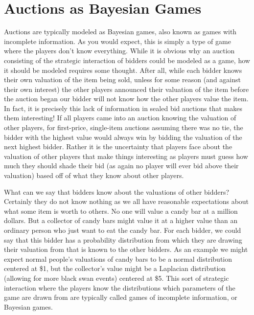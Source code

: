 \documentclass[12pt,twoside]{reedthesis}
\begin{document}
\section{Auctions as Bayesian Games}
Auctions are typically modeled as Bayesian games, also known as games with incomplete information. As you would expect, this is simply a type of game where the players don't know everything. While it is obvious why an auction consisting of the strategic interaction of bidders could be modeled as a game, how it should be modeled requires some thought. After all, while each bidder knows their own valuation of the item being sold, unless for some reason (and against their own interest) the other players announced their valuation of the item before the auction began our bidder will not know how the other players value the item. In fact, it is precisely this lack of information in sealed bid auctions that makes them interesting! If all players came into an auction knowing the valuation of other players, for first-price, single-item auctions assuming there was no tie, the bidder with the highest value would always win by bidding the valuation of the next highest bidder. Rather it is the uncertainty that players face about the valuation of other players that make things interesting as players must guess how much they should shade their bid (as again no player will ever bid above their valuation) based off of what they know about other players. 

What can we say that bidders know about the valuations of other bidders? Certainly they do not know nothing as we all have reasonable expectations about what some item is worth to others. No one will value a candy bar at a million dollars. But a collector of candy bars might value it at a higher value than an ordinary person who just want to eat the candy bar. For each bidder, we could say that this bidder has a probability distribution from which they are drawing their valuation from that is known to the other bidders. As an example we might expect normal people's valuations of candy bars to be a normal distribution centered at \$1, but the collector's value might be a Laplacian distribution (allowing for more black swan events) centered at \$5. This sort of strategic interaction where the players know the distributions which parameters of the game are drawn from are typically called games of incomplete information, or Bayesian games.
 
\end{document}

